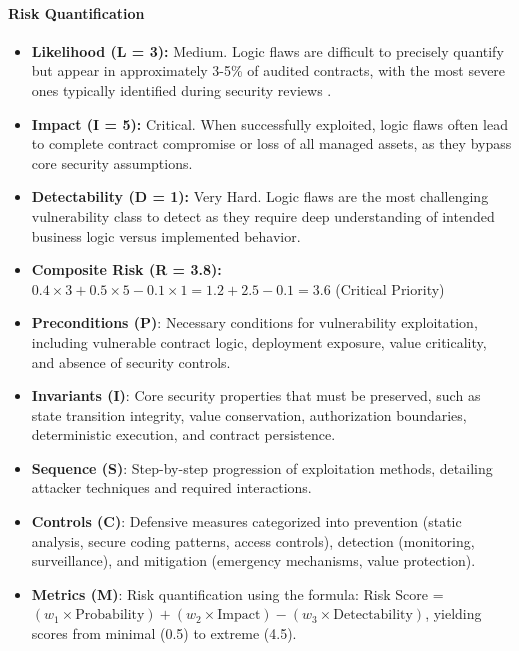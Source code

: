 \paragraph{Risk Quantification}

\begin{itemize}
\item \textbf{Likelihood (L = 3):} Medium. Logic flaws are difficult to precisely quantify but appear in approximately 3-5\% of audited contracts, with the most severe ones typically identified during security reviews \cite{zhou2023sok}.

\item \textbf{Impact (I = 5):} Critical. When successfully exploited, logic flaws often lead to complete contract compromise or loss of all managed assets, as they bypass core security assumptions.

\item \textbf{Detectability (D = 1):} Very Hard. Logic flaws are the most challenging vulnerability class to detect as they require deep understanding of intended business logic versus implemented behavior.

\item \textbf{Composite Risk (R = 3.8):} $0.4 \times 3 + 0.5 \times 5 - 0.1 \times 1 = 1.2 + 2.5 - 0.1 = 3.6$ (Critical Priority)
\end{itemize}
\begin{itemize}
\item \textbf{Preconditions (P)}: Necessary conditions for vulnerability exploitation, including vulnerable contract logic, deployment exposure, value criticality, and absence of security controls.
\item \textbf{Invariants (I)}: Core security properties that must be preserved, such as state transition integrity, value conservation, authorization boundaries, deterministic execution, and contract persistence.
\item \textbf{Sequence (S)}: Step-by-step progression of exploitation methods, detailing attacker techniques and required interactions.
\item \textbf{Controls (C)}: Defensive measures categorized into prevention (static analysis, secure coding patterns, access controls), detection (monitoring, surveillance), and mitigation (emergency mechanisms, value protection).
\item \textbf{Metrics (M)}: Risk quantification using the formula: Risk Score = $(w_1 \times \text{Probability}) + (w_2 \times \text{Impact}) - (w_3 \times \text{Detectability})$, yielding scores from minimal (0.5) to extreme (4.5).
\end{itemize}


